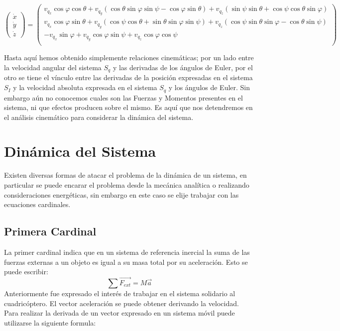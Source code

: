 \documentclass[main]{subfiles}
\begin{document}
\begin{footnotesize}

\begin{equation}
\left( \begin{array}{c}
\dot{x}\\
\dot{y}\\
\dot{z}
\end{array}  \right) = \left( \begin{array}{c}
v_{q_x} \cos \varphi \cos \theta + v_{q_y} ( \cos \theta \sin \varphi \sin \psi-\cos \varphi \sin \theta ) + v_{q_z}(\sin \psi \sin \theta + \cos \psi \cos \theta \sin \varphi)  \\
v_{q_x} \cos \varphi \sin \theta + v_{q_y} (\cos \psi \cos \theta + \sin \theta \sin \varphi \sin \psi) + v_{q_z}( \cos \psi \sin \theta \sin \varphi-\cos \theta \sin \psi ) \\
-v_{q_x} \sin \varphi  + v_{q_y} \cos \varphi \sin \psi  + v_{q_z}\cos \varphi \cos \psi \\
\end{array} \right)
\label{eq:pospunto}
\end{equation}
\end{footnotesize} 

Hasta aqu\'i hemos obtenido simplemente relaciones cinem\'aticas; por un lado entre la velocidad angular del sistema $S_q$ y las derivadas de los \'angulos de Euler, por el otro se tiene el v\'inculo entre las derivadas de la posici\'on expresadas en el sistema $S_I$ y la velocidad absoluta expresada en el sistema $S_q$ y los \'angulos de Euler. Sin embargo a\'un no conocemos cuales son las Fuerzas y Momentos presentes en el sistema, ni que efectos producen sobre el mismo. Es aqu\'i que nos detendremos en el an\'alisis cinem\'atico para considerar la din\'amica del sistema. 

\section{Din\'amica del Sistema}
Existen diversas formas de atacar el problema de la din\'amica de un sistema, en particular se puede encarar el problema desde la mec\'anica anal\'itica o realizando consideraciones energ\'eticas, sin embargo en este caso se elije trabajar con las ecuaciones cardinales. 
\subsection{Primera Cardinal}
 
La primer cardinal indica que en un sistema de referencia inercial la suma de las fuerzas externas a un objeto es igual a su masa total por su aceleraci\'on. Esto se puede escribir:
\begin{equation}
\sum \vec{F_{ext}} = M\vec{a}
\end{equation}
Anteriormente fue expresado el inter\'es de trabajar en el sistema solidario al cuadric\'optero. 
El vector aceleraci\'on se puede obtener derivando la velocidad. Para realizar la derivada de un vector expresado en un sistema m\'ovil puede utilizarse la siguiente formula:
\end{document}
